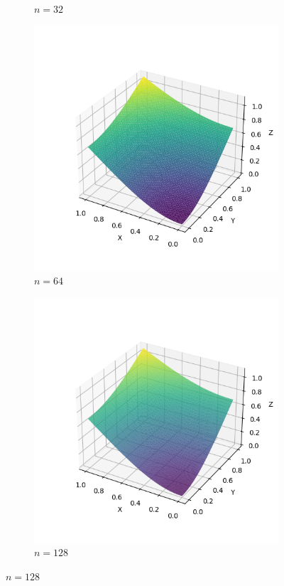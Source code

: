 \documentclass[lang=cn,a4paper,newtx,bibend=bibtex]{elegantpaper}
\begin{document}
\begin{figure}[H]
\begin{subfigure}[b]{0.18\textwidth}
      \caption{$n = 32$}
  \end{subfigure}
  \hfill
  \begin{subfigure}[b]{0.18\textwidth}
      \includegraphics[width=\textwidth]{../../res_bac/res-[data|3-Dirichlet-regular-d64].png}
      \caption{$n = 64$}
  \end{subfigure}
  \hfill
  \begin{subfigure}[b]{0.18\textwidth}
      \includegraphics[width=\textwidth]{../../res_bac/res-[data|3-Dirichlet-regular-e128].png}
      \caption{$n = 128$}
  \end{subfigure}
\end{figure}
\end{document}
